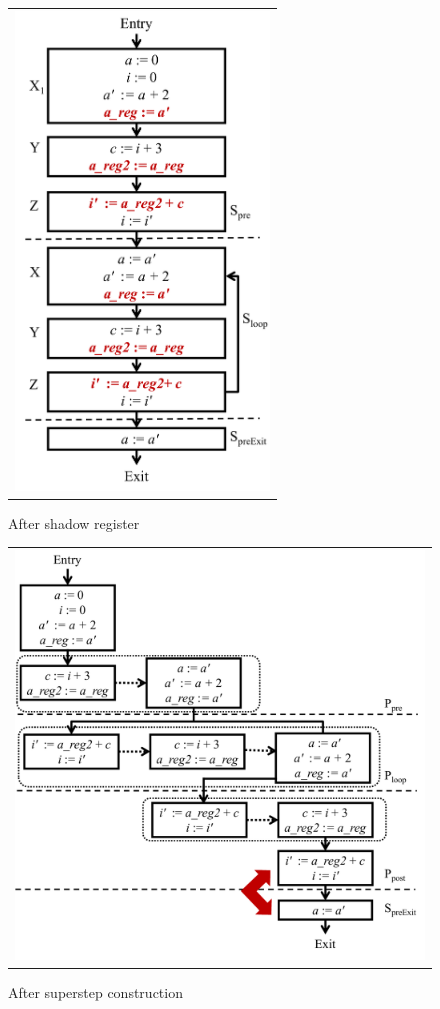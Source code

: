\begin{figure}[t!]
\begin{center}
\begin{tabular}{c}
\includegraphics[height=5in]{fig-proposal/algorithm-after-shadow-register}
\end{tabular}
\end{center}
\caption{After shadow register}
\label{fig:algo3-1}
\end{figure}

\begin{figure}[t!]
\begin{center}
\begin{tabular}{c}
\includegraphics[width=5.5in]{fig-proposal/algorithm-after-superstep-construction}
\end{tabular}
\end{center}
\caption{After superstep construction}
\label{fig:algo3-2}
\end{figure}

